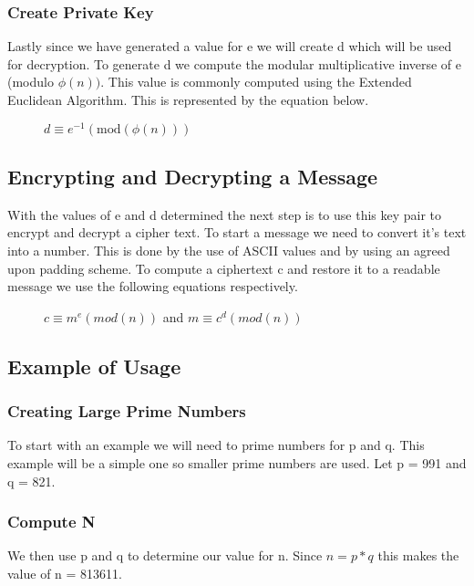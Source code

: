 \documentclass[conference]{IEEEtran}
\begin{document}
\subsubsection{Create Private Key}
Lastly since we have generated a value for e we will create d which will be used for decryption. To generate d we compute the modular multiplicative inverse of e (modulo $ \phi \left(n\right))$. This value is commonly computed using the Extended Euclidean Algorithm. This is represented by the equation below.
\begin{figure}[h]
	\begin{center}
		$d\equiv {e}^{-1}\left(\mathrm{mod}\left(\phi \left(n\right)\right)\right)$
	\end{center}
\end{figure}




\subsection{Encrypting and Decrypting a Message}

With the values of e and d determined the next step is to use this key pair to encrypt and decrypt a cipher text. To start a message we need to convert it's text into a number. This is done by the use of ASCII values and by using an agreed upon padding scheme. To compute a ciphertext c and restore it to a readable message we use the following equations respectively.

\begin{figure}[H]
	\begin{center}
		$c\equiv {m}^{e}\left(mod\left(n\right)\right)$ and
		$m\equiv {c}^{d}\left(mod\left(n\right)\right)$
	\end{center}
\end{figure}

\subsection{Example of Usage}
\subsubsection{Creating Large Prime Numbers}
To start with an example we will need to prime numbers for p and q. This example will be a simple one so smaller prime numbers are used. Let p = 991 and q = 821.
\subsubsection{Compute N}
We then use p and q to determine our value for n. Since $n = p * q$ this makes the value of n = 813611.
\end{document}
